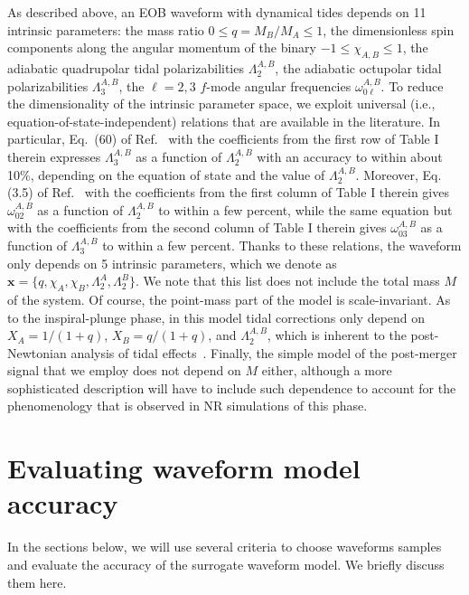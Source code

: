 \documentclass[prd,aps,letter,twocolumn,floatfix,notitlepage]{revtex4-1}
\begin{document}
As described above, an EOB waveform with dynamical tides depends on 11 intrinsic parameters: the mass ratio $0\leq q=M_B/M_A\leq1$, the dimensionless spin components along the angular momentum of the binary $-1 \leq \chi_{A,B} \leq1$, the adiabatic quadrupolar tidal polarizabilities $\Lambda_2^{A,B}$, the adiabatic octupolar tidal polarizabilities $\Lambda_3^{A,B}$, the $\ell=2,3$ $f$-mode angular frequencies $\omega_{0\ell}^{A,B}$. To reduce the dimensionality of the intrinsic parameter space, we exploit universal (i.e., equation-of-state-independent) relations that are available in the literature. In particular, Eq.~(60) of Ref.~\cite{Yagi:2013sva} with the coefficients from the first row of Table I therein expresses $\Lambda_3^{A,B}$ as a function of $\Lambda_2^{A,B}$ with an accuracy to within about 10\%, depending on the equation of state and the value of $\Lambda_2^{A,B}$. Moreover, Eq. (3.5) of Ref.~\cite{Chan:2014kua} with the coefficients from the first column of Table I therein gives $\omega_{02}^{A,B}$ as a function of $\Lambda_2^{A,B}$ to within a few percent, while the same equation but with the coefficients from the second column of Table I therein gives $\omega_{03}^{A,B}$ as a function of $\Lambda_3^{A,B}$ to within a few percent. Thanks to these relations, the waveform only depends on 5 intrinsic parameters, which we denote as $\boldsymbol{x}=\{q, \chi_A,\chi_B, \Lambda_2^A,\Lambda_2^B\}$. We note that this list does not include the total mass $M$ of the system. Of course, the point-mass part of the model is scale-invariant. As to the inspiral-plunge phase, in this model tidal corrections only depend on $X_A=1/(1+q)$, $X_B=q/(1+q)$, and $\Lambda_2^{A,B}$, which is inherent to the post-Newtonian analysis of tidal effects~\cite{Flanagan:2007ix}. Finally, the simple model of the post-merger signal that we employ does not depend on $M$ either, although a more sophisticated description will have to include such dependence to account for the phenomenology that is observed in NR simulations of this phase.


\section{Evaluating waveform model accuracy}

In the sections below, we will use several criteria to choose waveforms samples and evaluate the accuracy of the 
surrogate waveform model. We briefly discuss them here.
\end{document}

